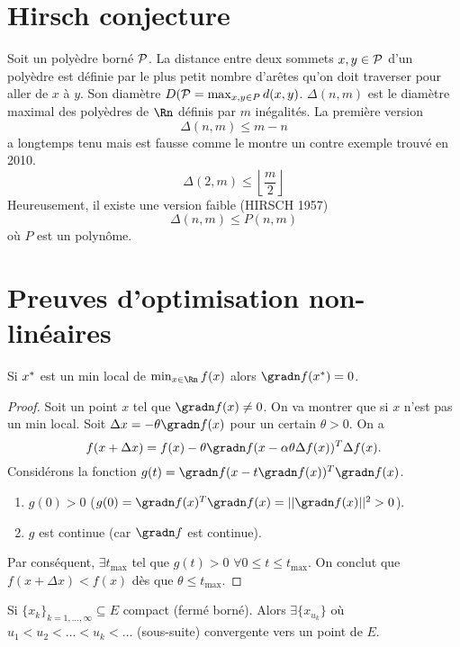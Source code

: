 \section{Hirsch conjecture}
Soit un polyèdre borné $\mathcal{P}$.
La distance entre deux sommets $x, y \in \mathcal{P}$ d'un polyèdre
est définie par le plus petit nombre d'arêtes qu'on doit traverser pour aller
de $x$ à $y$.
Son diamètre $D(\mathcal{P} = \max_{x, y \in P} d(x, y)$.
$\Delta(n, m)$ est le diamètre maximal des polyèdres de $\Rn$
définis par $m$ inégalités.
La première version
\[ \Delta(n, m) \leq m-n \]
a longtemps tenu mais est fausse comme le montre un contre exemple trouvé
en 2010.
\[ \Delta(2, m) \leq \left\lfloor\frac{m}{2}\right\rfloor \]
Heureusement, il existe une version faible (HIRSCH 1957)
\[ \Delta(n, m) \leq P(n, m) \]
où $P$ est un polynôme.

\section{Preuves d'optimisation non-linéaires}
\begin{mytheo}
  Si $x^*$ est un min local de $\min_{x \in \Rn}f(x)$ alors
  $\gradn f(\xopt) = 0$.
  \begin{proof}
    Soit un point $x$ tel que $\gradn f(x) \neq 0$.
    On va montrer que si $x$ n'est pas un min local.
    Soit $\Delta x  = -\theta \gradn f(x)$ pour un certain $\theta > 0$.
    On a
    \[ f(x + \Delta x) = f(x) - \theta\gradn f(x - \alpha\theta\Delta f(x))^T
    \Delta f(x). \]
    Considérons la fonction $g(t) = \gradn f(x - t\gradn f(x))^T \gradn f(x)$.
    \begin{enumerate}
      \item $g(0) > 0$ ($g(0) = \gradn f(x)^T\gradn f(x)
        = ||\gradn f(x)||^2 > 0$).
      \item $g$ est continue (car $\gradn f$ est continue).
    \end{enumerate}
    Par conséquent, $\exists t_\mathrm{max}$ tel que $g(t) > 0$
    $\forall 0 \leq t \leq t_\mathrm{max}$.
     On conclut que $f(x + \Delta x) < f(x)$ dès que
     $\theta \leq t_\mathrm{max}$.
  \end{proof}
\end{mytheo}

\begin{mytheo}
  Si $\{x_k\}_{k=1,\ldots,\infty} \subseteq E$ compact (fermé borné).
  Alors $\exists \{x_{u_k}\}$ où $u_1 < u_2 < \ldots < u_k < \ldots$
  (sous-suite) convergente vers un point de $E$.
\end{mytheo}

